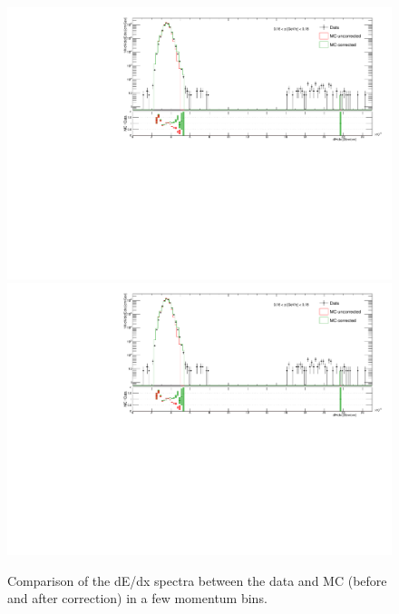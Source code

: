 \begin{figure}[hb]
{  \includegraphics[width=\linewidth,page=29]{graphics/corrections/dEdx_DataVsMC.pdf}\\
  \includegraphics[width=\linewidth,page=39]{graphics/corrections/dEdx_DataVsMC.pdf}
}%
\caption[Comparison of dE/dx spectra between data and MC.]{Comparison of the dE/dx spectra between the data and MC (before and after correction) in a few momentum bins.}\label{fig:dEdxDataVsMC}
\end{figure}








